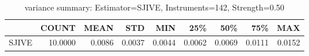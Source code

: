 \begin{table}[ht]
\centering
\caption{variance summary: Estimator=SJIVE, Instruments=142, Strength=0.50}
\begin{tabular}{lrrrrrrrr}
\toprule
 & COUNT & MEAN & STD & MIN & 25\% & 50\% & 75\% & MAX \\
\midrule
SJIVE & 10.0000 & 0.0086 & 0.0037 & 0.0044 & 0.0062 & 0.0069 & 0.0111 & 0.0152 \\
\bottomrule
\end{tabular}
\end{table}
